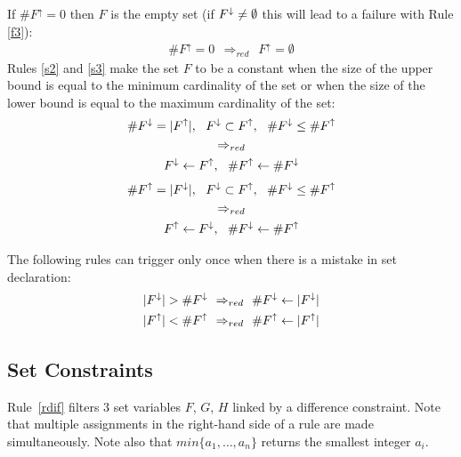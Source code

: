 \documentclass[3p,authoryear,times]{elsarticle}
\newcommand{\card}[1]{|#1|}
\newcommand{\MS}[1]{{{#1}^{\uparrow}}}
\newcommand{\ms}[1]{{\MakeUppercase{#1}^\downarrow}}
\newcommand{\MSF}[0]{\MS{F}}
\newcommand{\msF}[0]{\ms{f}}
\newcommand{\MC}[1]{{\#{#1}^\uparrow{}}}
\newcommand{\mc}[1]{{\#{#1}^\downarrow}}
\newcommand{\MCF}[0]{\MC{F}{}}
\newcommand{\mcF}[0]{\mc{F}{}}
\newcommand{\C}[1]{\card{#1}}
\newcommand{\rmin}[0]{{\Rightarrow_{red}}}
\begin{document}
If $\MCF=0$ then $F$ is the empty set (if 
$\msF\not=\emptyset$ 
this will lead to a failure with Rule \ref{f3}):
\begin{eqnarray}	
\MCF=0 ~~ \rmin ~~ \MSF=\emptyset %
\end{eqnarray}
%
Rules \ref{s2} and \ref{s3} make the set $F$ to be a constant when the size of the upper bound is equal to the minimum cardinality of the set or when the size of the lower bound is equal to the maximum cardinality of the set:
\begin{gather}	
\mcF = \C{\MSF}, ~~ \msF \subset \MSF, ~~\mcF \leq \MCF \nonumber \\
\rmin  \label{s2} \\
         \msF \leftarrow \MSF, ~~
         \MCF \leftarrow \mcF \nonumber 
\end{gather}
\begin{gather}	
\MCF = \C{\msF}, ~~ \msF \subset \MSF, ~~\mcF \leq \MCF \nonumber \\
\rmin \label{s3} \\
         \MSF \leftarrow \msF, ~~
         \mcF \leftarrow \MCF \nonumber 
\end{gather}

The following rules can trigger only once when there is a mistake in set declaration:
\begin{eqnarray}	
\card{\msF} > \mcF ~~ \rmin ~~ \mcF \leftarrow \card{\msF} \\%
 \card{\MSF} < \MCF ~~ \rmin ~~ \MCF \leftarrow \card{\MSF} %
\end{eqnarray}



\subsection{Set Constraints}
 Rule~\ref{rdif} filters 3 set variables $F$, $G$, $H$ linked by a difference constraint. Note that multiple assignments in the right-hand side of a rule are made simultaneously. Note also that
$min\{a_1,\ldots,a_n\}$ returns the smallest integer $a_i$.
\end{document}
